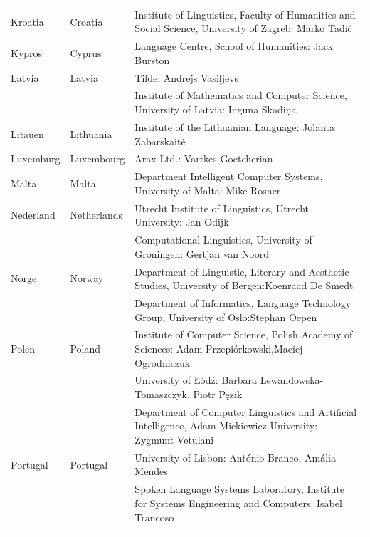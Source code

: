 \begin{longtable}{llp{114mm}}
  Kroatia & \textcolor{grey1}{Croatia} & Institute of Linguistics, Faculty of Humanities and Social Science, University of Zagreb: Marko Tadić \\ \addlinespace
  Kypros & \textcolor{grey1}{Cyprus} & Language Centre, School of
  Humanities: Jack Burston \\ \addlinespace
  Latvia & \textcolor{grey1}{Latvia} & Tilde: Andrejs Vasiļjevs\\ \addlinespace 
  & & Institute of Mathematics and Computer Science, University of Latvia: Inguna Skadiņa\\ \addlinespace
  Litauen & \textcolor{grey1}{Lithuania} & Institute of the Lithuanian Language: Jolanta Zabarskaitė\\ \addlinespace
  Luxemburg & \textcolor{grey1}{Luxembourg} & Arax Ltd.: Vartkes Goetcherian\\ \addlinespace
  Malta & \textcolor{grey1}{Malta} & Department Intelligent Computer Systems, University of Malta: Mike Rosner\\ \addlinespace
  Nederland & \textcolor{grey1}{Netherlands} & Utrecht Institute of Linguistics, Utrecht University: Jan Odijk\\ \addlinespace 
  & & Computational Linguistics, University of Groningen: Gertjan van Noord\\ \addlinespace 
  Norge & \textcolor{grey1}{Norway} & Department of Linguistic, Literary and Aesthetic Studies, University of Bergen:\newline Koenraad De Smedt\\ \addlinespace 
  & & Department of Informatics, Language Technology Group, University of Oslo:\newline Stephan Oepen \\ \addlinespace
  Polen & \textcolor{grey1}{Poland} & Institute of Computer Science, Polish Academy of Sciences: Adam Przepiórkowski,\newline Maciej Ogrodniczuk \\ \addlinespace
  & & University of Łódź: Barbara Lewandowska-Tomaszczyk, Piotr Pęzik\\ \addlinespace 
  & & Department of Computer Linguistics and Artificial Intelligence, Adam Mickiewicz University: Zygmunt Vetulani\\ \addlinespace  
  Portugal & \textcolor{grey1}{Portugal} & University of Lisbon: António Branco, Amália Mendes \\ \addlinespace
  & & Spoken Language Systems Laboratory, Institute for Systems Engineering and Computers: Isabel Trancoso \\ \addlinespace

\end{longtable}

